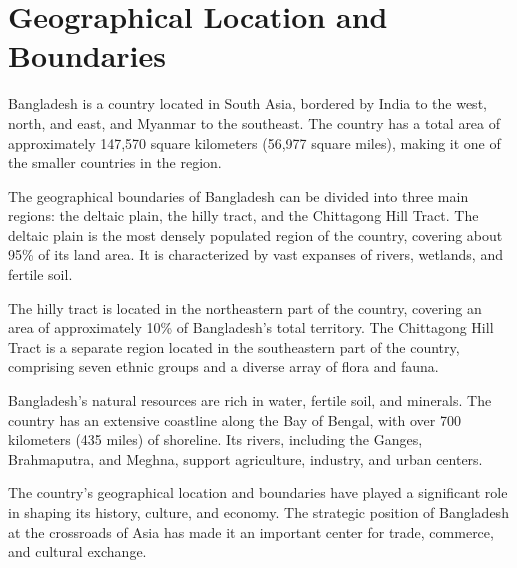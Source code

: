 

\section*{Geographical Location and Boundaries}

Bangladesh is a country located in South Asia, bordered by India to the west, north, and east, and Myanmar to the southeast. The country has a total area of approximately 147,570 square kilometers (56,977 square miles), making it one of the smaller countries in the region.

The geographical boundaries of Bangladesh can be divided into three main regions: the deltaic plain, the hilly tract, and the Chittagong Hill Tract. The deltaic plain is the most densely populated region of the country, covering about 95\% of its land area. It is characterized by vast expanses of rivers, wetlands, and fertile soil.

The hilly tract is located in the northeastern part of the country, covering an area of approximately 10\% of Bangladesh's total territory. The Chittagong Hill Tract is a separate region located in the southeastern part of the country, comprising seven ethnic groups and a diverse array of flora and fauna.

Bangladesh's natural resources are rich in water, fertile soil, and minerals. The country has an extensive coastline along the Bay of Bengal, with over 700 kilometers (435 miles) of shoreline. Its rivers, including the Ganges, Brahmaputra, and Meghna, support agriculture, industry, and urban centers.

The country's geographical location and boundaries have played a significant role in shaping its history, culture, and economy. The strategic position of Bangladesh at the crossroads of Asia has made it an important center for trade, commerce, and cultural exchange.

